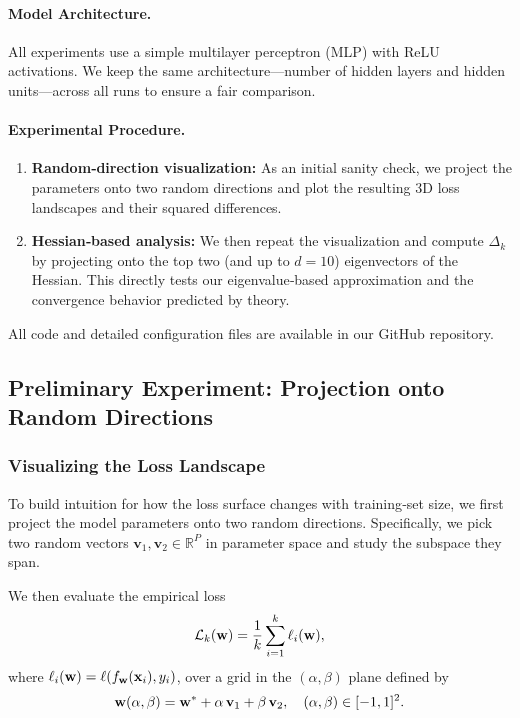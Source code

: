\documentclass{article}
\begin{document}
\paragraph{Model Architecture.}
All experiments use a simple multilayer perceptron (MLP) with ReLU activations.  We keep the same architecture—number of hidden layers
and hidden units—across all runs to ensure a fair comparison.

\paragraph{Experimental Procedure.}
\begin{enumerate}
  \item \textbf{Random‐direction visualization:} As an initial sanity check, we project the parameters onto two random directions and
        plot the resulting 3D loss landscapes and their squared differences.
  \item \textbf{Hessian‐based analysis:} We then repeat the visualization and compute $\Delta_k$ by projecting onto the top two
        (and up to $d = 10$) eigenvectors of the Hessian.  This directly tests our eigenvalue‐based approximation and the convergence behavior
        predicted by theory.
\end{enumerate}

All code and detailed configuration files are available in our GitHub repository.

\subsection{Preliminary Experiment: Projection onto Random Directions}
\subsubsection{Visualizing the Loss Landscape}

To build intuition for how the loss surface changes with training‐set size, we first project the model parameters onto two random
directions. Specifically, we pick two random vectors $\mathbf v_1, \mathbf v_2 \in \mathbb R^P$ in parameter space and study the
subspace they span.

We then evaluate the empirical loss
$$
  \mathcal{L}_k(\mathbf{w}) =
  \frac1k \sum_{i=1}^k \ell_i(\mathbf{w}),
$$
where $\ell_i(\mathbf{w}) = \ell (f_{\mathbf{w}}(\mathbf{x}_i), y_i)$, over a grid in the $(\alpha, \beta)$ plane defined by
$$
  \mathbf{w}(\alpha,\beta) =
  \mathbf{w}^* + \alpha\, \mathbf v_1 + \beta\, \mathbf v_2, \quad
  (\alpha, \beta) \in [-1,1]^2.
$$
\end{document}
